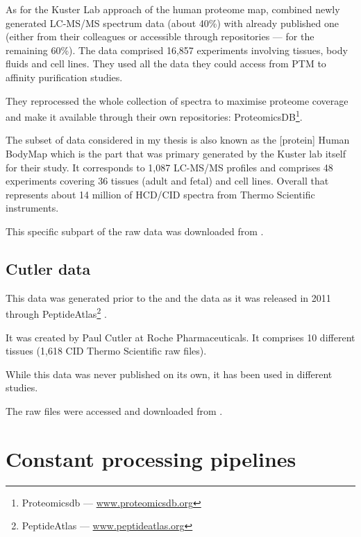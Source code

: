 As for the Kuster Lab approach of the human proteome map,
\cite{KusterData} combined newly generated \gls{LC-MS/MS} spectrum
data (about 40\%) with already published one
(either from their colleagues or accessible through repositories ---
for the remaining 60\%).
The data comprised 16,857 experiments involving tissues, body fluids and cell
lines. They used all the data they could access from \gls{PTM} to affinity
purification studies.

They reprocessed the whole collection of spectra to maximise proteome coverage
and make it available through their own repositories: ProteomicsDB\footnote{%
Proteomicsdb --- %
\href{https://www.proteomicsdb.org/}{www.proteomicsdb.org}}.

The subset of data considered in my thesis is also
known as the [protein] Human BodyMap which is the part that was primary generated
by the Kuster lab itself for their study. It corresponds to 1,087 \gls{LC-MS/MS}
profiles and comprises 48 experiments covering 36 tissues (adult and fetal) and
cell lines. Overall that represents about 14 million of \gls{HCD}/\gls{CID}
spectra from Thermo Scientific instruments.

This specific subpart of the raw data was downloaded from .

\subsection{Cutler data}
\begin{comment}
    rexpliquer quelle partie reutilisée
\end{comment}

This data was generated prior to the  and the 
data as it was released in 2011 through PeptideAtlas\footnote{PeptideAtlas --- %
\href{http://www.peptideatlas.org/}{www.peptideatlas.org}}
\citep{PeptideAtlas}.

It was created by Paul Cutler at Roche Pharmaceuticals.
It comprises 10 different tissues (1,618 \gls{CID} Thermo Scientific raw files).

While this data was never published on its own, it has been used in different
studies. %

The raw files were accessed and downloaded from .


\section{Constant processing pipelines}

